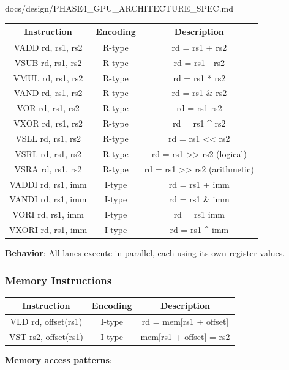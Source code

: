 \begin{relocated}{docs/design/PHASE4_GPU_ARCHITECTURE_SPEC.md}
{
\begin{longtable}[]{@{}ccc@{}}
\toprule\noalign{}
Instruction & Encoding & Description \\
\midrule\noalign{}
\endhead
\bottomrule\noalign{}
\endlastfoot
VADD rd, rs1, rs2 & R-type & rd = rs1 + rs2 \\
VSUB rd, rs1, rs2 & R-type & rd = rs1 - rs2 \\
VMUL rd, rs1, rs2 & R-type & rd = rs1 * rs2 \\
VAND rd, rs1, rs2 & R-type & rd = rs1 \& rs2 \\
VOR rd, rs1, rs2 & R-type & rd = rs1 \textbar{} rs2 \\
VXOR rd, rs1, rs2 & R-type & rd = rs1 \^{} rs2 \\
VSLL rd, rs1, rs2 & R-type & rd = rs1 \textless\textless{} rs2 \\
VSRL rd, rs1, rs2 & R-type & rd = rs1 \textgreater\textgreater{} rs2
(logical) \\
VSRA rd, rs1, rs2 & R-type & rd = rs1 \textgreater\textgreater{} rs2
(arithmetic) \\
VADDI rd, rs1, imm & I-type & rd = rs1 + imm \\
VANDI rd, rs1, imm & I-type & rd = rs1 \& imm \\
VORI rd, rs1, imm & I-type & rd = rs1 \textbar{} imm \\
VXORI rd, rs1, imm & I-type & rd = rs1 \^{} imm \\
\end{longtable}
}

\textbf{Behavior}: All lanes execute in parallel, each using its own
register values.

\subsubsection{Memory Instructions}\label{ds:ch:phase4-gpu-architecture:memory-instructions}

{
\begin{longtable}[]{@{}ccc@{}}
\toprule\noalign{}
Instruction & Encoding & Description \\
\midrule\noalign{}
\endhead
\bottomrule\noalign{}
\endlastfoot
VLD rd, offset(rs1) & I-type & rd = mem{[}rs1 + offset{]} \\
VST rs2, offset(rs1) & I-type & mem{[}rs1 + offset{]} = rs2 \\
\end{longtable}
}

\textbf{Memory access patterns}:


\end{relocated}
